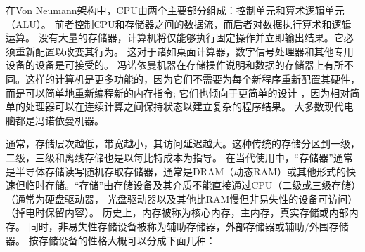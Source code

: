 在Von Neumann架构中，CPU由两个主要部分组成：控制单元和算术逻辑单元（ALU）。
前者控制CPU和存储器之间的数据流，而后者对数据执行算术和逻辑运算。
没有大量的存储器，计算机将仅能够执行固定操作并立即输出结果。它必须重新配置以改变其行为。
这对于诸如桌面计算器，数字信号处理器和其他专用设备的设备是可接受的。
冯诺依曼机器在存储操作说明和数据的存储器上有所不同。这样的计算机是更多功能的，因为它们不需要为每个新程序重新配置其硬件，
而是可以简单地重新编程新的内存指令; 它们也倾向于更简单的设计
，因为相对简单的处理器可以在连续计算之间保持状态以建立复杂的程序结果。
大多数现代电脑都是冯诺依曼机器。

通常，存储层次越低，带宽越小，其访问延迟越大。这种传统的存储分区到一级，二级，三级和离线存储也是以每比特成本为指导。
在当代使用中，“存储器”通常是半导体存储读写随机存取存储器，通常是DRAM（动态RAM）或其他形式的快速但临时存储。“存储”由存储设备及其介质不能直接通过CPU（二级或三级存储）（通常为硬盘驱动器，
光盘驱动器以及其他比RAM慢但非易失性的设备可访问）（掉电时保留内容）。
历史上，内存被称为核心内存，主内存，真实存储或内部内存。
同时，非易失性存储设备被称为辅助存储器，外部存储器或辅助/外围存储器。
按存储设备的性格大概可以分成下面几种：
